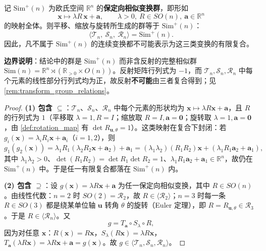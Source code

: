 \begin{proposition}[三者的生成范围恰为保定向相似群]\label{prop:similitude_group}
记 $\mathrm{Sim}^{+}(n)$ 为欧氏空间 $\mathbb R^n$ 的\textbf{保定向相似变换群}，即形如
\[
\mathbf x \mapsto \lambda R\,\mathbf x + \mathbf a, \qquad \lambda>0,\ R\in SO(n),\ \mathbf a\in\mathbb R^n
\]
的映射全体。则平移、缩放与旋转所生成的群等于 $\mathrm{Sim}^{+}(n)$：
\[
\langle \mathcal{T}_n,\ \mathcal{S}_n,\ \mathcal{R}_n\rangle = \mathrm{Sim}^{+}(n).
\]
因此，凡不属于 $\mathrm{Sim}^{+}(n)$ 的连续变换都不可能表示为这三类变换的有限复合。

\textbf{边界说明}：结论中的群是 $\mathrm{Sim}^{+}(n)$ 而非含反射的完整相似群 $\mathrm{Sim}(n)=\mathbb R^n\rtimes(\mathbb R_{>0}\times O(n))$。反射矩阵行列式为 $-1$，而 $\mathcal T_n,\mathcal S_n,\mathcal R_n$ 中每个元素的线性部分行列式均为正，故反射\textbf{不可能}由三者复合得到；见 \cref{rem:transform_group_relations}。
\end{proposition}

\begin{proof}
\textbf{(1) 包含 $\subseteq$}：$\mathcal T_n$、$\mathcal S_n$、$\mathcal R_n$ 中每个元素的形状均为 $\mathbf x\mapsto\lambda R\mathbf x+\mathbf a$，且 $R$ 的行列式为 $1$（平移取 $\lambda=1,R=I$；缩放取 $R=I,\mathbf a=\mathbf 0$；旋转取 $\lambda=1,\mathbf a=\mathbf 0$，由 \cref{def:rotation_map} 有 $\det R_{\mathbf u,\theta}=1$）。这类映射在复合下封闭：若 $g_i(\mathbf x)=\lambda_iR_i\mathbf x+\mathbf a_i$（$i=1,2$），则
\[
g_1(g_2(\mathbf x)) = \lambda_1R_1(\lambda_2R_2\mathbf x+\mathbf a_2)+\mathbf a_1
= (\lambda_1\lambda_2)(R_1R_2)\mathbf x + (\lambda_1R_1\mathbf a_2+\mathbf a_1),
\]
其中 $\lambda_1\lambda_2>0$、$\det(R_1R_2)=\det R_1\det R_2=1$、$\lambda_1R_1\mathbf a_2+\mathbf a_1\in\mathbb R^n$，故仍在 $\mathrm{Sim}^{+}(n)$ 中。于是任一有限复合都落在 $\mathrm{Sim}^{+}(n)$ 内。

\textbf{(2) 包含 $\supseteq$}：设 $g(\mathbf x)=\lambda R\mathbf x+\mathbf a$ 为任一保定向相似变换，其中 $R\in SO(n)$。由线性代数：$n=2$ 时 $SO(2)=\mathcal R_2$，故 $R\in\langle\mathcal R_2\rangle$；$n=3$ 时每一条 $R\in SO(3)$ 都是绕某单位轴 $\mathbf u$ 转角 $\theta$ 的旋转（Euler 定理），即 $R=R_{\mathbf u,\theta}\in\mathcal R_3$。于是 $R\in\langle\mathcal R_n\rangle$。又
\[
g = T_{\mathbf a}\circ S_\lambda\circ R,
\]
因为对任意 $\mathbf x$：$R(\mathbf x)=R\mathbf x$，$S_\lambda(R\mathbf x)=\lambda R\mathbf x$，$T_{\mathbf a}(\lambda R\mathbf x)=\lambda R\mathbf x+\mathbf a=g(\mathbf x)$。故 $g\in\langle\mathcal T_n,\mathcal S_n,\mathcal R_n\rangle$。
\end{proof}

